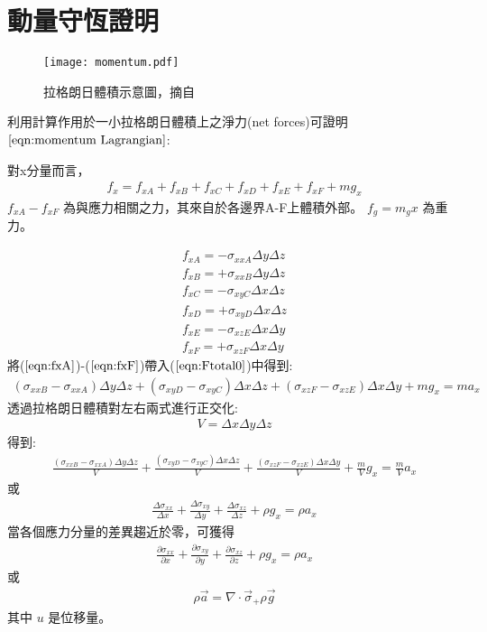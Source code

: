 
\section{動量守恆證明}
\begin{figure*}[ht!]
    \centering
    \texttt{[image: momentum.pdf]}
    \caption{ 拉格朗日體積示意圖，摘自\citet{Gerya2009}}
    \label{fig::Lagrangian Volume Momentum}
\end{figure*}
利用計算作用於一小拉格朗日體積上之淨力(net forces)可證明$\ref{eqn:momentum Lagrangian}$:

對x分量而言，
\begin{align}
f_x=f_{xA}+f_{xB}+f_{xC}+f_{xD}+f_{xE}+f_{xF}+mg_x \label{eqn:Ftotal0}
\end{align}
$f_{xA}- f_{xF}$ 為與應力相關之力，其來自於各邊界A-F上體積外部。 
$f_g=m_gx$ 為重力。

\begin{align}
f_{xA} = -\sigma_{xxA}\Delta y\Delta z\label{eqn:fxA}\\
f_{xB} = +\sigma_{xxB}\Delta y\Delta z\label{eqn:fxB}\\
f_{xC} = -\sigma_{xyC}\Delta x\Delta z\label{eqn:fxC}\\
f_{xD} = +\sigma_{xyD}\Delta x\Delta z\label{eqn:fxD}\\
f_{xE} = -\sigma_{xzE}\Delta x\Delta y\label{eqn:fxE}\\
f_{xF} = +\sigma_{xzF}\Delta x\Delta y\label{eqn:fxF}
\end{align}
將($\ref{eqn:fxA}$)-($\ref{eqn:fxF}$)帶入($\ref{eqn:Ftotal0}$)中得到:
\begin{align}
(\sigma_{xxB}-\sigma_{xxA})\Delta y\Delta z+(\sigma_{xyD}-\sigma_{xyC})\Delta x\Delta z+(\sigma_{xzF}-\sigma_{xzE})\Delta x\Delta y+mg_x = ma_x 
\end{align}
透過拉格朗日體積對左右兩式進行正交化:
\begin{align}
V=\Delta x\Delta y\Delta z
\end{align}
得到:
\begin{align}
\frac{(\sigma_{xxB}-\sigma_{xxA})\Delta y\Delta z}{V}+\frac{(\sigma_{xyD}-\sigma_{xyC})\Delta x\Delta z}{V}+\frac{(\sigma_{xzF}-\sigma_{xzE})\Delta x\Delta y}{V}+\frac{m}{V}g_x=\frac{m}{V}a_x
\end{align}
或
\begin{align}
\frac{\Delta\sigma_{xx}}{\Delta x}+\frac{\Delta\sigma_{xy}}{\Delta y}+\frac{\Delta\sigma_{xz}}{\Delta z}+\rho g_x = \rho a_x
\end{align}
當各個應力分量的差異趨近於零，可獲得
\begin{align}
\frac{\partial\sigma_{xx}}{\partial x}+\frac{\partial\sigma_{xy}}{\partial y}+\frac{\partial\sigma_{xz}}{\partial z}+\rho g_x = \rho a_x
\end{align}
或
\begin{align}
    \rho \vec a = \nabla\cdot\vec\sigma_+\rho\vec g
\end{align}
其中 $u$ 是位移量。

